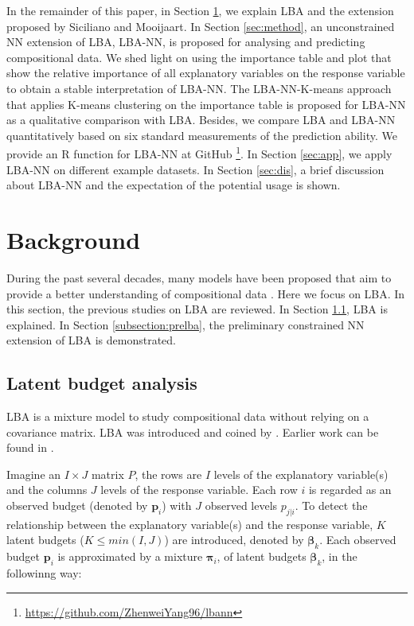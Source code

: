 \documentclass[]{interact}
\theoremstyle{plain}%
\theoremstyle{definition}
\theoremstyle{remark}
\begin{document}
In the remainder of this paper, in Section \ref{sec:bg}, we explain LBA
and the extension proposed by Siciliano and Mooijaart. In Section
\ref{sec:method}, an unconstrained NN extension of LBA, LBA-NN, is
proposed for analysing and predicting compositional data. We shed light
on using the importance table and plot that show the relative importance
of all explanatory variables on the response variable to obtain a stable
interpretation of LBA-NN. The LBA-NN-K-means approach that applies
K-means clustering on the importance table is proposed for LBA-NN as a
qualitative comparison with LBA. Besides, we compare LBA and LBA-NN
quantitatively based on six standard measurements of the prediction
ability. We provide an R function for LBA-NN at GitHub
\footnote{\label{footnote:lbann} \url{https://github.com/ZhenweiYang96/lbann}}.
In Section \ref{sec:app}, we apply LBA-NN on different example datasets.
In Section \ref{sec:dis}, a brief discussion about LBA-NN and the
expectation of the potential usage is shown.

\hypertarget{sec:bg}{%
\section{Background}\label{sec:bg}}

During the past several decades, many models have been proposed that aim
to provide a better understanding of compositional data
\citep{desarbo1993, hsu2019}. Here we focus on LBA. In this section, the
previous studies on LBA are reviewed. In Section \ref{subsection:lba},
LBA is explained. In Section \ref{subsection:prelba}, the preliminary
constrained NN extension of LBA is demonstrated.

\hypertarget{subsection:lba}{%
\subsection{Latent budget analysis}\label{subsection:lba}}

LBA is a mixture model to study compositional data without relying on a
covariance matrix. LBA was introduced and coined by \cite{devan1988}.
Earlier work can be found in \cite{goodman1974}.

Imagine an \(I \times J\) matrix \(P\), the rows are \(I\) levels of the
explanatory variable(s) and the columns \(J\) levels of the response
variable. Each row \(i\) is regarded as an observed budget (denoted by
\(\bm{p}_i\)) with \(J\) observed levels \(p_{j|i}\). To detect the
relationship between the explanatory variable(s) and the response
variable, \(K\) latent budgets (\(K \leq min(I,J)\)) are introduced,
denoted by \(\boldsymbol\beta_k\). Each observed budget \(\bm{p}_i\) is
approximated by a mixture \(\boldsymbol\pi_i\), of latent budgets
\(\boldsymbol\beta_k\), in the followinng way:
\end{document}
